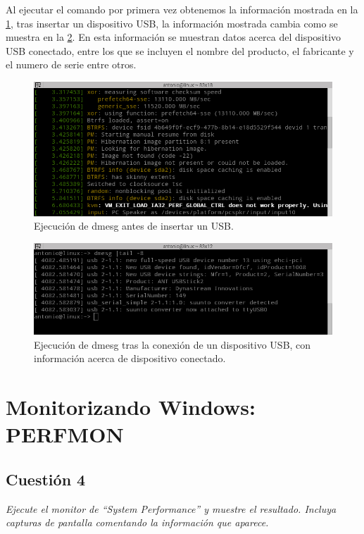 Al ejecutar el comando por primera vez obtenemos la información mostrada en la  \cref{fig2}, tras insertar un dispositivo USB, la información mostrada cambia como se muestra en la  \cref{fig3}. En esta información se muestran datos acerca del dispositivo USB conectado, entre los que se incluyen el nombre del producto, el fabricante y el numero de serie entre otros.
\begin{figure}[H]
  \begin{center}
    \includegraphics[width=1\textwidth]{imagenes/dmesg1}
    \caption{Ejecución de dmesg antes de insertar un USB.}
    \label{fig2}
  \end{center}
\end{figure}
\begin{figure}[H]
  \begin{center}
    \includegraphics[width=1\textwidth]{imagenes/dmesg2}
    \caption{Ejecución de dmesg tras la conexión de un dispositivo USB, con información acerca de dispositivo conectado.}
    \label{fig3}
  \end{center}
\end{figure}

\section{Monitorizando Windows: PERFMON}
\subsection{Cuestión 4}
\textit{Ejecute el monitor de ``System Performance'' y muestre el resultado. Incluya capturas de pantalla comentando la información que aparece.}
\newline

